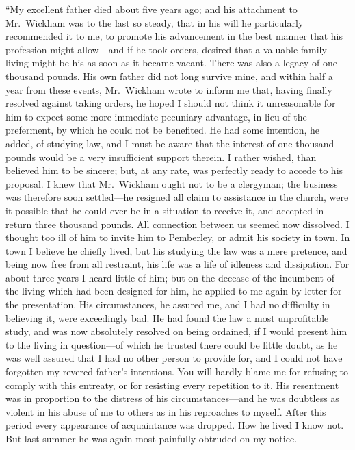 ``My excellent father died about five years ago; and his attachment
to Mr.\ Wickham was to the last so steady, that in his will he
particularly recommended it to me, to promote his advancement in
the best manner that his profession might allow---and if he took
orders, desired that a valuable family living might be his as soon
as it became vacant.  There was also a legacy of one thousand
pounds.  His own father did not long survive mine, and within half
a year from these events, Mr.\ Wickham wrote to inform me that,
having finally resolved against taking orders, he hoped I should
not think it unreasonable for him to expect some more immediate
pecuniary advantage, in lieu of the preferment, by which he could
not be benefited.  He had some intention, he added, of studying
law, and I must be aware that the interest of one thousand pounds
would be a very insufficient support therein.  I rather wished,
than believed him to be sincere; but, at any rate, was perfectly
ready to accede to his proposal.  I knew that Mr.\ Wickham
ought not to be a clergyman; the business was therefore soon
settled---he resigned all claim to assistance in the church, were
it possible that he could ever be in a situation to receive it,
and accepted in return three thousand pounds.  All connection
between us seemed now dissolved.  I thought too ill of him to
invite him to Pemberley, or admit his society in town.  In town
I believe he chiefly lived, but his studying the law was a mere
pretence, and being now free from all restraint, his life was a
life of idleness and dissipation.  For about three years I heard
little of him; but on the decease of the incumbent of the living
which had been designed for him, he applied to me again by letter
for the presentation.  His circumstances, he assured me, and I
had no difficulty in believing it, were exceedingly bad.  He had
found the law a most unprofitable study, and was now absolutely
resolved on being ordained, if I would present him to the living
in question---of which he trusted there could be little doubt, as
he was well assured that I had no other person to provide for,
and I could not have forgotten my revered father's intentions.
You will hardly blame me for refusing to comply with this entreaty,
or for resisting every repetition to it.  His resentment was in
proportion to the distress of his circumstances---and he was
doubtless as violent in his abuse of me to others as in his
reproaches to myself.  After this period every appearance of
acquaintance was dropped.  How he lived I know not.  But last
summer he was again most painfully obtruded on my notice.

